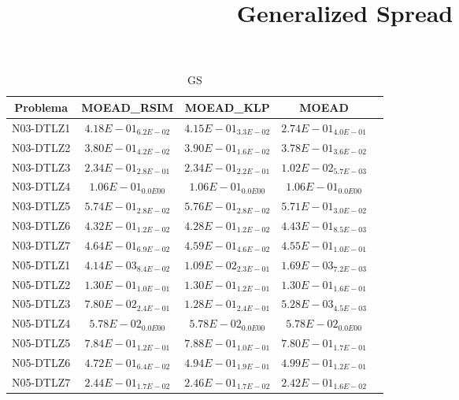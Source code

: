 \documentclass{article}
\title{Generalized Spread}
\author{}
\begin{document}
\maketitle
\begin{table*}[ht!]
\scriptsize
\caption{GS}
\centering\begin{tabular}{|c||c||c||c||c|} \hline
Problema &MOEAD_RSIM &MOEAD_KLP &MOEAD\\\hline
N03-DTLZ1 &$4.18E-01_{6.2E-02}$ &\cellcolor{gray25}$4.15E-01_{3.3E-02}$ &\cellcolor{gray95}$2.74E-01_{4.0E-01}$\\ 
\hline
N03-DTLZ2 &\cellcolor{gray25}$3.80E-01_{4.2E-02}$ &$3.90E-01_{1.6E-02}$ &\cellcolor{gray95}$3.78E-01_{3.6E-02}$\\ 
\hline
N03-DTLZ3 &$2.34E-01_{2.8E-01}$ &\cellcolor{gray25}$2.34E-01_{2.2E-01}$ &\cellcolor{gray95}$1.02E-02_{5.7E-03}$\\ 
\hline
N03-DTLZ4 &\cellcolor{gray95}$1.06E-01_{0.0E00}$ &\cellcolor{gray25}$1.06E-01_{0.0E00}$ &$1.06E-01_{0.0E00}$\\ 
\hline
N03-DTLZ5 &\cellcolor{gray25}$5.74E-01_{2.8E-02}$ &$5.76E-01_{2.8E-02}$ &\cellcolor{gray95}$5.71E-01_{3.0E-02}$\\ 
\hline
N03-DTLZ6 &\cellcolor{gray25}$4.32E-01_{1.2E-02}$ &\cellcolor{gray95}$4.28E-01_{1.2E-02}$ &$4.43E-01_{8.5E-03}$\\ 
\hline
N03-DTLZ7 &$4.64E-01_{6.9E-02}$ &\cellcolor{gray25}$4.59E-01_{4.6E-02}$ &\cellcolor{gray95}$4.55E-01_{1.0E-01}$\\ 
\hline
N05-DTLZ1 &\cellcolor{gray25}$4.14E-03_{8.4E-02}$ &$1.09E-02_{2.3E-01}$ &\cellcolor{gray95}$1.69E-03_{7.2E-03}$\\ 
\hline
N05-DTLZ2 &\cellcolor{gray95}$1.30E-01_{1.0E-01}$ &\cellcolor{gray25}$1.30E-01_{1.2E-01}$ &$1.30E-01_{1.6E-01}$\\ 
\hline
N05-DTLZ3 &\cellcolor{gray25}$7.80E-02_{2.4E-01}$ &$1.28E-01_{2.4E-01}$ &\cellcolor{gray95}$5.28E-03_{4.5E-03}$\\ 
\hline
N05-DTLZ4 &\cellcolor{gray95}$5.78E-02_{0.0E00}$ &\cellcolor{gray25}$5.78E-02_{0.0E00}$ &$5.78E-02_{0.0E00}$\\ 
\hline
N05-DTLZ5 &\cellcolor{gray25}$7.84E-01_{1.2E-01}$ &$7.88E-01_{1.0E-01}$ &\cellcolor{gray95}$7.80E-01_{1.7E-01}$\\ 
\hline
N05-DTLZ6 &\cellcolor{gray95}$4.72E-01_{6.4E-02}$ &\cellcolor{gray25}$4.94E-01_{1.9E-01}$ &$4.99E-01_{1.2E-01}$\\ 
\hline
N05-DTLZ7 &\cellcolor{gray25}$2.44E-01_{1.7E-02}$ &$2.46E-01_{1.7E-02}$ &\cellcolor{gray95}$2.42E-01_{1.6E-02}$\\ 

\end{tabular}
\end{table*}
\end{document}
